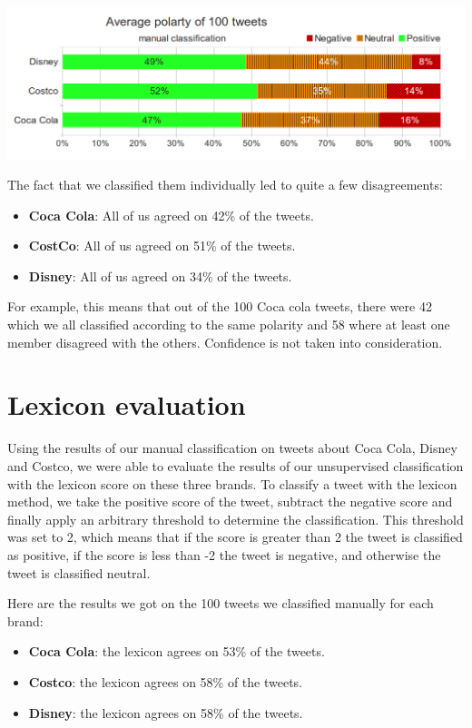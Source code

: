 \documentclass[a4paper,12pt]{report}
\begin{document}
\centerline{\includegraphics[scale=0.55]{../img/man1.png}}

The fact that we classified them individually led to quite a few disagreements:

\begin{itemize}
        \item \textbf{Coca Cola}: All of us agreed on 42\% of the tweets.
        \item \textbf{CostCo}: All of us agreed on 51\% of the tweets.
        \item \textbf{Disney}: All of us agreed on 34\% of the tweets.
\end{itemize}

For example, this means that out of the 100 Coca cola tweets, there were 42 which we all classified according to the same polarity and 58 where at least one member disagreed with the others. Confidence is not taken into consideration.

\section{Lexicon evaluation}

Using the results of our manual classification on tweets about Coca Cola, Disney and Costco, we were able to evaluate the results of our unsupervised classification with the lexicon score on these three brands.
To classify a tweet with the lexicon method, we take the positive score of the tweet, subtract the negative score and finally apply an arbitrary threshold to determine the classification.
This threshold was set to 2, which means that if the score is greater than 2 the tweet is classified as positive, if the score is less than -2 the tweet is negative, and otherwise the tweet is classified neutral.

Here are the results we got on the 100 tweets we classified manually for each brand:
\begin{itemize}
        \item \textbf{Coca Cola}: the lexicon agrees on 53\% of the tweets.
        \item \textbf{Costco}: the lexicon agrees on 58\% of the tweets.
        \item \textbf{Disney}: the lexicon agrees on 58\% of the tweets.
\end{itemize}
\end{document}

